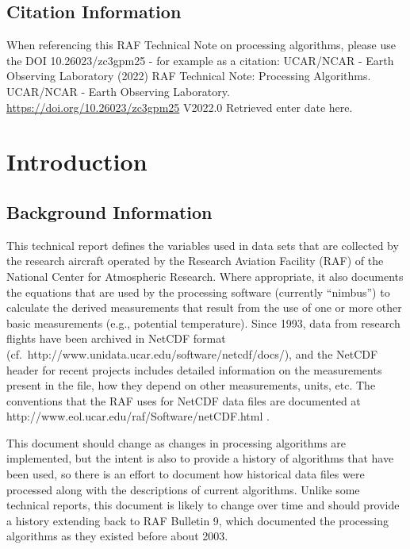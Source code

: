 \documentclass[
  english,
]{book}
\begin{document}
\hypertarget{citation-information}{%
\section{Citation Information}\label{citation-information}}

When referencing this RAF Technical Note on processing algorithms,
please use the DOI 10.26023/zc3gpm25 - for example as a citation:
UCAR/NCAR - Earth Observing Laboratory (2022) RAF Technical Note:
Processing Algorithms. UCAR/NCAR - Earth Observing Laboratory.
\url{https://doi.org/10.26023/zc3gpm25} V2022.0 Retrieved enter date
here.

\hypertarget{introduction}{%
\chapter{Introduction}\label{introduction}}

\hypertarget{background-information}{%
\section{Background Information}\label{background-information}}

This technical report defines the variables used in data sets that are
collected by the research aircraft operated by the Research Aviation
Facility (RAF) of the National Center for Atmospheric Research. Where
appropriate, it also documents the equations that are used by the
processing software (currently ``nimbus'') to calculate the derived
measurements that result from the use of one or more other basic
measurements (e.g., potential temperature). Since 1993, data from
research flights have been archived in NetCDF format
(cf.~http://www.unidata.ucar.edu/software/netcdf/docs/), and the NetCDF
header for recent projects includes detailed information on the
measurements present in the file, how they depend on other measurements,
units, etc. The conventions that the RAF uses for NetCDF data files are
documented at http://www.eol.ucar.edu/raf/Software/netCDF.html .

This document should change as changes in processing algorithms are
implemented, but the intent is also to provide a history of algorithms
that have been used, so there is an effort to document how historical
data files were processed along with the descriptions of current
algorithms. Unlike some technical reports, this document is likely to
change over time and should provide a history extending back to RAF
Bulletin 9, which documented the processing algorithms as they existed
before about 2003.
\end{document}
